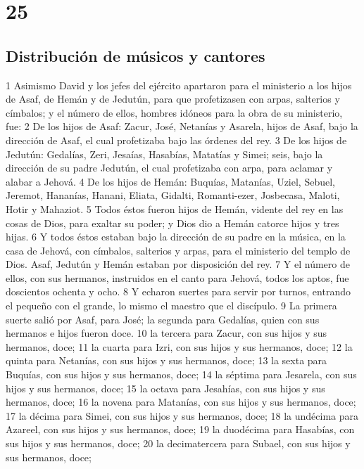 \chapter{25}

\section*{Distribución de músicos y cantores}

1 Asimismo David y los jefes del ejército apartaron para el ministerio a los hijos de Asaf, de Hemán y de Jedutún, para que profetizasen con arpas, salterios y címbalos; y el número de ellos, hombres idóneos para la obra de su ministerio, fue:
2 De los hijos de Asaf: Zacur, José, Netanías y Asarela, hijos de Asaf, bajo la dirección de Asaf, el cual profetizaba bajo las órdenes del rey.
3 De los hijos de Jedutún: Gedalías, Zeri, Jesaías, Hasabías, Matatías y Simei; seis, bajo la dirección de su padre Jedutún, el cual profetizaba con arpa, para aclamar y alabar a Jehová.
4 De los hijos de Hemán: Buquías, Matanías, Uziel, Sebuel, Jeremot, Hananías, Hanani, Eliata, Gidalti, Romanti-ezer, Josbecasa, Maloti, Hotir y Mahaziot.
5 Todos éstos fueron hijos de Hemán, vidente del rey en las cosas de Dios, para exaltar su poder; y Dios dio a Hemán catorce hijos y tres hijas.
6 Y todos éstos estaban bajo la dirección de su padre en la música, en la casa de Jehová, con címbalos, salterios y arpas, para el ministerio del templo de Dios. Asaf, Jedutún y Hemán estaban por disposición del rey.
7 Y el número de ellos, con sus hermanos, instruidos en el canto para Jehová, todos los aptos, fue doscientos ochenta y ocho.
8 Y echaron suertes para servir por turnos, entrando el pequeño con el grande, lo mismo el maestro que el discípulo.
9 La primera suerte salió por Asaf, para José; la segunda para Gedalías, quien con sus hermanos e hijos fueron doce.
10 la tercera para Zacur, con sus hijos y sus hermanos, doce;
11 la cuarta para Izri, con sus hijos y sus hermanos, doce;
12 la quinta para Netanías, con sus hijos y sus hermanos, doce;
13 la sexta para Buquías, con sus hijos y sus hermanos, doce;
14 la séptima para Jesarela, con sus hijos y sus hermanos, doce;
15 la octava para Jesahías, con sus hijos y sus hermanos, doce;
16 la novena para Matanías, con sus hijos y sus hermanos, doce;
17 la décima para Simei, con sus hijos y sus hermanos, doce;
18 la undécima para Azareel, con sus hijos y sus hermanos, doce;
19 la duodécima para Hasabías, con sus hijos y sus hermanos, doce;
20 la decimatercera para Subael, con sus hijos y sus hermanos, doce;
